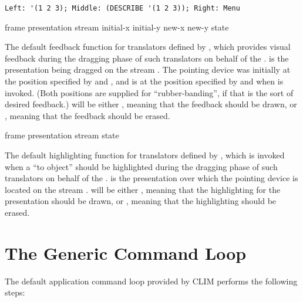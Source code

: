 \begin{verbatim}
Left: '(1 2 3); Middle: (DESCRIBE '(1 2 3)); Right: Menu
\end{verbatim}


 {frame presentation stream
                                            initial-x initial-y new-x new-y state}

The default feedback function for translators defined by
, which provides visual feedback during the
dragging phase of such translators on behalf of the  .
 is the presentation being dragged on the stream .
The pointing device was initially at the position specified by 
and , and is at the position specified by  and
 when  is invoked.  (Both positions
are supplied for ``rubber-banding'', if that is the sort of desired feedback.)
 will be either , meaning that the feedback should be
drawn, or , meaning that the feedback should be erased.

 {frame presentation stream state}

The default highlighting function for translators defined by
, which is invoked when a ``to object''
should be highlighted during the dragging phase of such translators on behalf of
the  .   is the presentation over which
the pointing device is located on the stream .   will be
either , meaning that the highlighting for the presentation
should be drawn, or , meaning that the highlighting should be
erased.


\section {The Generic Command Loop}

The default application command loop provided by CLIM performs the following
steps:

